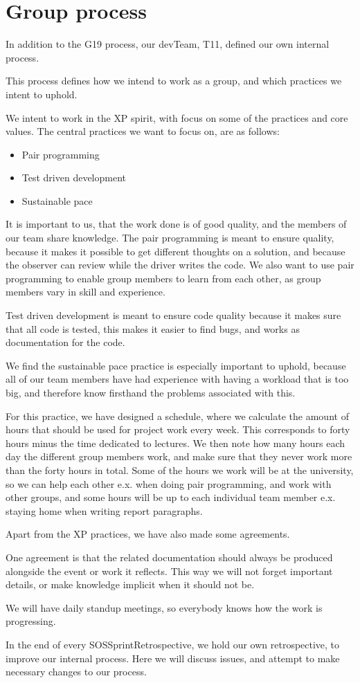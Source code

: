 \section{Group process}

In addition to the \gls{G19} process, our \gls{devTeam}, \gls{T11}, defined our own internal process.

This process defines how we intend to work as a group, and which practices we intent to uphold.

We intent to work in the \gls{XP} spirit, with focus on some of the practices and core values.
The central practices we want to focus on, are as follows:
\begin{itemize}
    \item Pair programming
    \item Test driven development
    \item Sustainable pace
\end{itemize}

It is important to us, that the work done is of good quality, and the members of our team share knowledge. The pair programming is meant to ensure quality, because it makes it possible to get different thoughts on a solution, and because the observer can review while the \gls{driver} writes the code. We also want to use pair programming to enable group members to learn from each other, as group members vary in skill and experience.

Test driven development is meant to ensure code quality because it makes sure that all code is tested, this makes it easier to find bugs, and works as documentation for the code.

We find the sustainable pace practice is especially important to uphold, because all of our team members have had experience with having a workload that is too big, and therefore know firsthand the problems associated with this.

For this practice, we have designed a schedule, where we calculate the amount of hours that should be used for project work every week. This corresponds to forty hours minus the time dedicated to lectures. We then note how many hours each day the different group members work, and make sure that they never work more than the forty hours in total. Some of the hours we work will be at the university, so we can help each other e.x. when doing pair programming, and work with other groups, and some hours will be up to each individual team member e.x. staying home when writing report paragraphs.

Apart from the \gls{XP} practices, we have also made some agreements.

One agreement is that the related documentation should always be produced alongside the event or work it reflects. This way we will not forget important details, or make knowledge implicit when it should not be.

We will have daily standup meetings, so everybody knows how the work is progressing.

In the end of every \gls{SOSSprintRetrospective}, we hold our own retrospective, to improve our internal process. Here we will discuss issues, and attempt to make necessary changes to our process.

